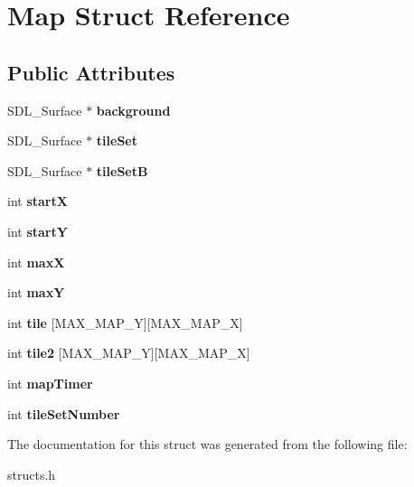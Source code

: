 \hypertarget{structMap}{\section{Map Struct Reference}
\label{structMap}
}
\subsection*{Public Attributes}
\begin{DoxyCompactItemize}
\item 
\hypertarget{structMap_a4e5b5f8caa592075319b99fc221669da}{S\-D\-L\-\_\-\-Surface $\ast$ {\bfseries background}}\label{structMap_a4e5b5f8caa592075319b99fc221669da}

\item 
\hypertarget{structMap_a6d8bfdb98244f585d4bbfe8f5553aa05}{S\-D\-L\-\_\-\-Surface $\ast$ {\bfseries tile\-Set}}\label{structMap_a6d8bfdb98244f585d4bbfe8f5553aa05}

\item 
\hypertarget{structMap_a2dfdc9720d3b4e753d04c78945c5e660}{S\-D\-L\-\_\-\-Surface $\ast$ {\bfseries tile\-Set\-B}}\label{structMap_a2dfdc9720d3b4e753d04c78945c5e660}

\item 
\hypertarget{structMap_aec09a812761311faef72bd6aae7eb586}{int {\bfseries start\-X}}\label{structMap_aec09a812761311faef72bd6aae7eb586}

\item 
\hypertarget{structMap_a0d8a9a37385dbb4c831b61f72af82081}{int {\bfseries start\-Y}}\label{structMap_a0d8a9a37385dbb4c831b61f72af82081}

\item 
\hypertarget{structMap_aedd73d1e84a7b38af317cf066b5c9204}{int {\bfseries max\-X}}\label{structMap_aedd73d1e84a7b38af317cf066b5c9204}

\item 
\hypertarget{structMap_adb307add6076311e6fea122875955d5f}{int {\bfseries max\-Y}}\label{structMap_adb307add6076311e6fea122875955d5f}

\item 
\hypertarget{structMap_a5db27696ddd638a3ac857be81fbfbb24}{int {\bfseries tile} \mbox{[}M\-A\-X\-\_\-\-M\-A\-P\-\_\-\-Y\mbox{]}\mbox{[}M\-A\-X\-\_\-\-M\-A\-P\-\_\-\-X\mbox{]}}\label{structMap_a5db27696ddd638a3ac857be81fbfbb24}

\item 
\hypertarget{structMap_ab62e5aafa464b7520ac904f076e29dc9}{int {\bfseries tile2} \mbox{[}M\-A\-X\-\_\-\-M\-A\-P\-\_\-\-Y\mbox{]}\mbox{[}M\-A\-X\-\_\-\-M\-A\-P\-\_\-\-X\mbox{]}}\label{structMap_ab62e5aafa464b7520ac904f076e29dc9}

\item 
\hypertarget{structMap_af6a69c55b9a66b60c2f3cb42b4197ed6}{int {\bfseries map\-Timer}}\label{structMap_af6a69c55b9a66b60c2f3cb42b4197ed6}

\item 
\hypertarget{structMap_a7d57186a5d2fa14ad9fe0404ed9c6921}{int {\bfseries tile\-Set\-Number}}\label{structMap_a7d57186a5d2fa14ad9fe0404ed9c6921}

\end{DoxyCompactItemize}


The documentation for this struct was generated from the following file\-:\begin{DoxyCompactItemize}
\item 
structs.\-h\end{DoxyCompactItemize}
